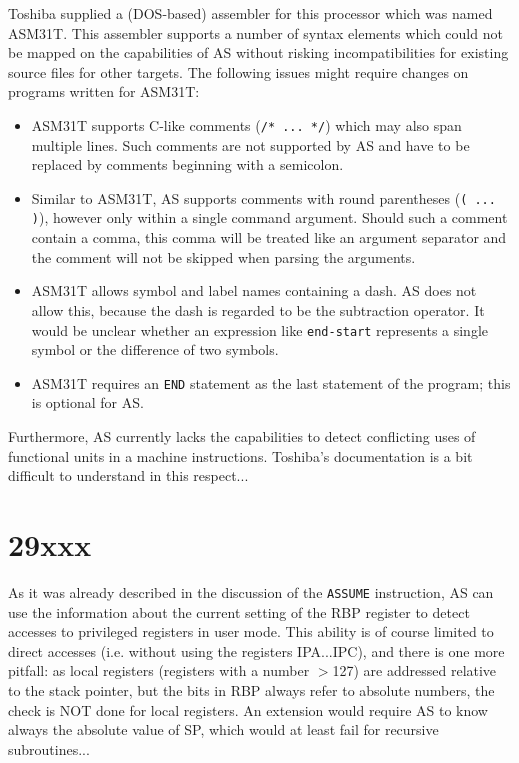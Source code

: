 \documentclass[12pt,twoside]{report}
\newcommand{\tty}[1]{{\tt #1}}
\begin{document}
Toshiba supplied a (DOS-based) assembler for this processor which
was named ASM31T.  This assembler supports a number of syntax
elements which could not be mapped on the capabilities of AS
without risking incompatibilities for existing source files for
other targets.  The following issues might require changes on
programs written for ASM31T:

\begin{itemize}
\item{ASM31T supports C-like comments (\verb!/* ... */!) which
      may also span multiple lines.  Such comments are not
      supported by AS and have to be replaced by comments
      beginning with a semicolon.}
\item{Similar to ASM31T, AS supports comments with round parentheses
      (\verb!( ... )!), however only within a single command
      argument.  Should such a comment contain a comma, this
      comma will be treated like an argument separator and the
      comment will not be skipped when parsing the arguments.}
\item{ASM31T allows symbol and label names containing a dash.
      AS does not allow this, because the dash is regarded to be
      the subtraction operator.  It would be unclear whether an
      expression like \verb!end-start! represents a single symbol
      or the difference of two symbols.}
\item{ASM31T requires an \tty{END} statement as the last
      statement of the program; this is optional for AS.}
\end{itemize}

Furthermore, AS currently lacks the capabilities to detect
conflicting uses of functional units in a machine instructions.
Toshiba's documentation is a bit difficult to understand in this
respect...


\section{29xxx}

As it was already described in the discussion of the \tty{ASSUME}
instruction, AS can use the information about the current setting of
the RBP register to detect accesses to privileged registers in user
mode.  This ability is of course limited to direct accesses (i.e.
without using the registers IPA...IPC), and there is one more
pitfall: as local registers (registers with a number $>$127) are
addressed relative to the stack pointer, but the bits in RBP always
refer to absolute numbers, the check is NOT done for local registers.
An extension would require AS to know always the absolute value of
SP, which would at least fail for recursive subroutines...
\end{document}
